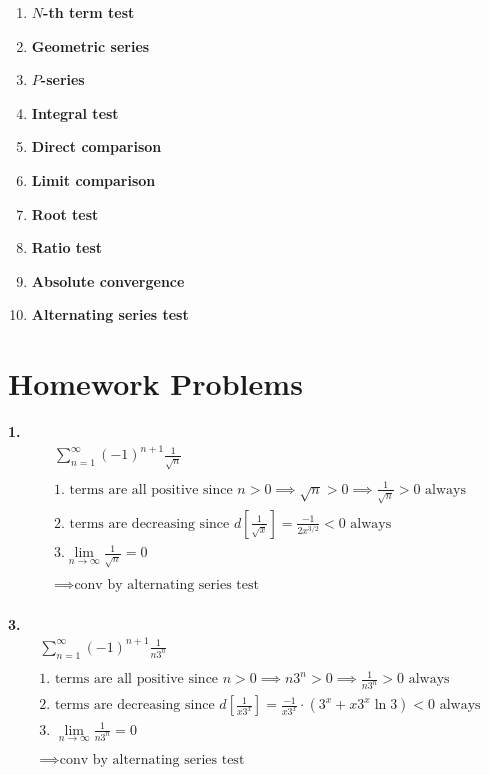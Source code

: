 \documentclass{article}
\begin{document}
\begin{enumerate}
\item \textbf{$N$-th term test}
\item \textbf{Geometric series}
\item \textbf{$P$-series}
\item \textbf{Integral test}
\item \textbf{Direct comparison}
\item \textbf{Limit comparison}
\item \textbf{Root test}
\item \textbf{Ratio test}
\item \textbf{Absolute convergence}
\item \textbf{Alternating series test}
\end{enumerate}

\newpage

\section*{Homework Problems}

\noindent
\textbf{1.}
\begin{gather*}
\sum_{n=1}^{\infty} (-1)^{n+1} \frac{1}{\sqrt{n}}
\\
\\
\text{1. terms are all positive since } n > 0 \implies \sqrt{n} > 0
\implies \frac{1}{\sqrt{n}} > 0 \text{~always}
\\
\text{2. terms are decreasing since } d \left[ \frac{1}{\sqrt{x}} \right]
= \frac{-1}{2x^{3/2}} < 0 \text{~always}
\\
\text{3.}
\lim_{n \to \infty} \frac{1}{\sqrt{n}}=0
\\
\\
\implies \text{conv by alternating series test}
\end{gather*}
\hfill
\\




\noindent
\textbf{3.}
\begin{gather*}
\sum_{n=1}^{\infty} (-1)^{n+1} \frac{1}{n3^n}
\\
\\
\text{1. terms are all positive since } n > 0 \implies n3^n > 0
\implies \frac{1}{n3^n}>0 \text{~always}
\\
\text{2. terms are decreasing since } d \left[ \frac{1}{x3^x} \right]
= \frac{-1}{x3^x} \cdot (3^x+x 3^x \ln 3) < 0 \text{~always}
\\
\text{3. }
\lim_{n \to \infty} \frac{1}{n3^n} = 0
\\
\\
\implies \text{conv by alternating series test}
\end{gather*}
\hfill
\\
\end{document}
